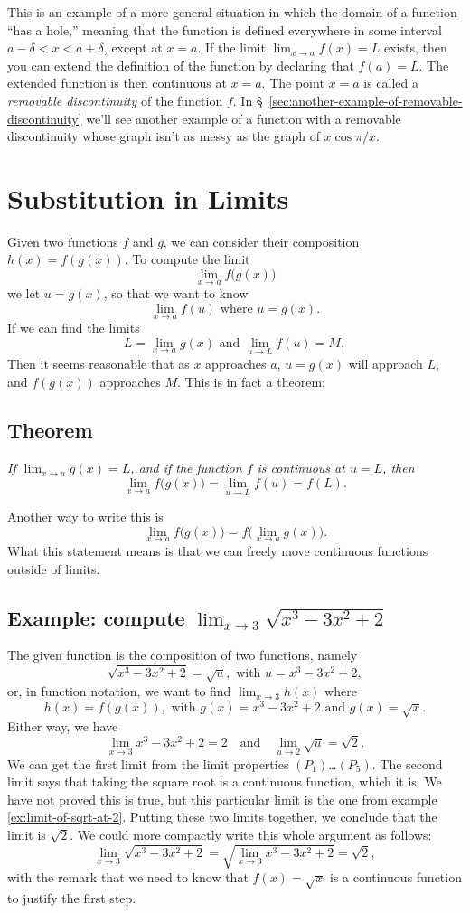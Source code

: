 This is an example of a more general situation in which the domain of
a function ``has a hole,'' meaning that the function is defined
everywhere in some interval $a-\delta <x < a+\delta$, except at $x=a$.
If the limit $\lim_{x\to a} f(x) = L$ exists, then you can extend the
definition of the function by declaring that $f(a) = L$.  The extended
function is then continuous at $x=a$.  The point $x=a$ is called a
\emph{removable discontinuity} of the function $f$.  In
\S~\ref{sec:another-example-of-removable-discontinuity} we'll see
another example of a function with a removable discontinuity whose
graph isn't as messy as the graph of $x\cos\pi/x$.


\section{Substitution in Limits} 
\label{sec:substitution-in-limits} Given
two functions $f$ and $g$, we can consider their composition $h(x) = f(g(x))$.
To compute the limit
\[
\lim_{x\to a} f\bigl(g(x)\bigr)
\]
we let $u=g(x)$, so that we want to know
\[
\lim_{x\to a}f(u) \text{ where }u=g(x).
\]
If we can find the limits
\[
L = \lim_{x\to a} g(x)\text{ and } \lim_{u\to L} f(u) = M,
\]
Then it seems reasonable that as $x$ approaches $a$, $u=g(x)$ will approach
$L$, and $f(g(x))$ approaches $M$.
This is in fact a theorem:
\subsection{Theorem} 
\label{thm:substitution}%
\itshape%
If $\lim_{x\to a}g(x) = L$, and if the function $f$ is continuous at $u=L$,
then
\[
\lim_{x\to a}f\bigl(g(x)\bigr) = \lim_{u\to L}f(u) = f(L).
\]\upshape

Another way to write this is
\[
\lim_{x\to a}f\bigl(g(x)\bigr) = f\bigl(\lim_{x\to a}g(x)\bigr).
\]
What this statement means is that we can freely move continuous functions outside of limits.
\subsection{Example: compute $\lim_{x\to3}\sqrt{x^3-3x^2+2}$} 
The given function is the composition of two functions, namely
\[
\sqrt{x^3-3x^2+2} = \sqrt u, \text{ with } u = x^3-3x^2+2,
\]
or, in function notation, we want to find $\lim_{x\to 3}h(x)$ where
\[
h(x) = f(g(x)), \text{ with } g(x) = x^3-3x^2+2\text{ and }g(x) = \sqrt{x}.
\]
Either way, we have
\[
\lim_{x\to 3}x^3-3x^2+2 = 2\quad\text{and}\quad \lim_{u\to 2}\sqrt u =
\sqrt 2.
\]
We can get the first limit from the limit properties $(P_1)$\ldots$(P_5)$.
The second limit says that taking the square root is a continuous function,
which it is. We have not proved this is true, but this particular limit is
the one from example \ref{ex:limit-of-sqrt-at-2}.  Putting these two limits
together, we conclude that the limit is $\sqrt2$.
We could more compactly write this whole argument as follows:
\[
\lim_{x\to3}\sqrt{x^3 - 3x^2 + 2} =\sqrt{\lim_{x\to 3}x^3 - 3x^2 + 2}
=\sqrt 2,
\]
with the remark that we need to know that $f(x)=\sqrt x$ is a continuous
function to justify the first step.

